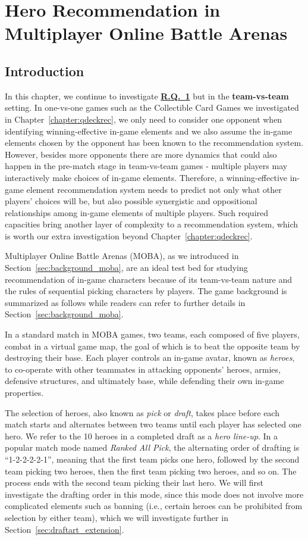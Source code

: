 \chapter{Hero Recommendation in Multiplayer Online Battle Arenas} 

\label{chapter:draftart} 

\section{Introduction}

In this chapter, we continue to investigate \hyperref[rq1]{\textbf{R.Q.~1}} but in the \textbf{team-vs-team} setting. In one-vs-one games such as the Collectible Card Games we investigated in Chapter~\ref{chapter:qdeckrec}, we only need to consider one opponent when identifying winning-effective in-game elements and we also assume the in-game elements chosen by the opponent has been known to the recommendation system. However, besides more opponents there are more dynamics that could also happen in the pre-match stage in team-vs-team games - multiple players may interactively make choices of in-game elements. Therefore, a winning-effective in-game element recommendation system needs to predict not only what other players' choices will be, but also possible synergistic and oppositional relationships among in-game elements of multiple players. Such required capacities bring another layer of complexity to a recommendation system, which is worth our extra investigation beyond Chapter~\ref{chapter:qdeckrec}.

Multiplayer Online Battle Arenas (MOBA), as we introduced in Section~\ref{sec:background_moba}, are an ideal test bed for studying recommendation of in-game characters because of its team-vs-team nature and the rules of sequential picking characters by players. The game background is summarized as follows while readers can refer to further details in Section~\ref{sec:background_moba}.

In a standard match in MOBA games, two teams, each composed of five players, combat in a virtual game map, the goal of which is to beat the opposite team by destroying their base. Each player controls an in-game avatar, known as \textit{heroes}, to co-operate with other teammates in attacking opponents' heroes, armies, defensive structures, and ultimately base, while defending their own in-game properties. 

The selection of heroes, also known as \textit{pick} or \textit{draft}, takes place before each match starts and alternates between two teams until each player has selected one hero. We refer to the 10 heroes in a completed draft as a \textit{hero line-up}. In a popular match mode
named \textit{Ranked All Pick}, the alternating order of drafting is ``1-2-2-2-2-1'', meaning that the first team picks one hero, followed by the second team picking two heroes, then the first team picking two heroes, and so on. The process ends with the second team picking their last hero. We will first investigate the drafting order in this mode, since this mode does not involve more complicated elements such as banning (i.e., certain heroes can be prohibited from selection by either team), which we will investigate further in Section~\ref{sec:draftart_extension}. 

